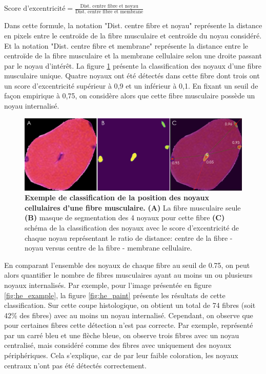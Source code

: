 \(\text{Score d'excentricité} = \frac{\text{Dist. centre fibre et noyau}}{\text{Dist. centre fibre et membrane}}\)

Dans cette formule, la notation "Dist. centre fibre et noyau" représente la distance en pixels entre le centroïde de la fibre musculaire et centroïde du noyau considéré. Et la notation "Dist. centre fibre et membrane" représente la distance entre le centroïde de la fibre musculaire et la membrane cellulaire selon une droite passant par le noyau d'intérêt. La figure \ref{fig:he_single_nuc} présente la classification des noyaux d'une fibre musculaire unique. Quatre noyaux ont été détectés dans cette fibre dont trois ont un score d'excentricité supérieur à 0,9 et un inférieur à 0,1. En fixant un seuil de façon empirique à 0,75, on considère alors que cette fibre musculaire possède un noyau internalisé.
\begin{figure}[!ht]
 \centering
 \includegraphics[width=1\textwidth]{figures/he_single_nuc.png}
 \caption[Exemple de classification de la position des noyaux]{\textbf{Exemple de classification de la position des noyaux cellulaires d'une fibre musculaire.} \textbf{(A)} La fibre musculaire seule \textbf{(B)} masque de segmentation des 4 noyaux pour cette fibre \textbf{(C)} schéma de la classification des noyaux avec le score d'excentricité de chaque noyau représentant le ratio de distance: centre de la fibre - noyau versus centre de la fibre - membrane cellulaire.}
 \label{fig:he_single_nuc}
\end{figure}
En comparant l'ensemble des noyaux de chaque fibre au seuil de 0.75, on peut alors quantifier le nombre de fibres musculaires ayant au moins un ou plusieurs noyaux internalisés. Par exemple, pour l'image présentée en figure \ref{fig:he_example}, la figure \ref{fig:he_paint} présente les résultats de cette classification. Sur cette coupe histologique, on obtient un total de 74 fibres (soit 42\% des fibres) avec au moins un noyau internalisé. Cependant, on observe que pour certaines fibres cette détection n'est pas correcte. Par exemple, représenté par un carré bleu et une flèche bleue, on observe trois fibres avec un noyau centralisé, mais considéré comme des fibres avec uniquement des noyaux périphériques. Cela s'explique, car de par leur faible coloration, les noyaux centraux n'ont pas été détectés correctement.
